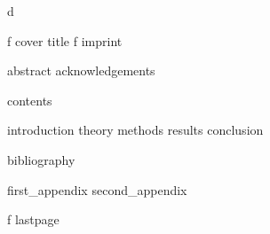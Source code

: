 


\if\thesisStatus d %
\fi



\if\thesisStatus f
	{cover}
\fi
{}
{title}
\if\thesisStatus f
	{imprint}
\fi

{abstract}
{acknowledgements}

{contents}


{introduction}
{theory}
{methods}
{results}
{conclusion}

{bibliography}

\cleardoublepage
\appendix
{}
{first_appendix}
{second_appendix}

\if\thesisStatus f
	{lastpage}
\fi

